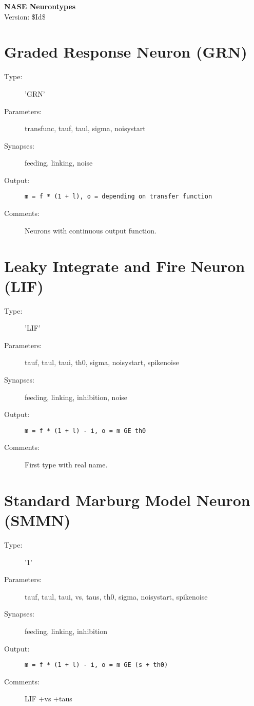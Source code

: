 \documentclass[12pt]{article}
\begin{document}
\begin{center}
{\Huge\textbf{NASE Neurontypes}}\\[2cm]
Version: \$Id$ $\$ 
\end{center}

\tableofcontents

\section{Graded Response Neuron (GRN)}
\begin{description}
\item[Type:] 'GRN'

\item[Parameters:] transfunc, tauf, taul, sigma, noisystart

\item[Synapses:] feeding, linking, noise

\item[Output:] \texttt{m = f * (1 + l), o = depending on transfer function}

\item[Comments:] Neurons with continuous output function.
\end{description}

\section{Leaky Integrate and Fire Neuron (LIF)}
\begin{description}
\item[Type:] 'LIF'

\item[Parameters:] tauf, taul, taui, th0, sigma, noisystart, spikenoise

\item[Synapses:] feeding, linking, inhibition, noise

\item[Output:] \texttt{m = f * (1 + l) - i, o = m GE th0}

\item[Comments:] First type with real name.
\end{description}



\section{Standard Marburg Model Neuron (SMMN)}
\begin{description}
\item[Type:] '1'

\item[Parameters:] tauf, taul, taui, vs, taus, th0, sigma, noisystart, spikenoise

\item[Synapses:] feeding, linking, inhibition

\item[Output:] \texttt{m = f * (1 + l) - i, o = m GE (s + th0)}

\item[Comments:] LIF +vs +taus
\end{description}
\end{document}
